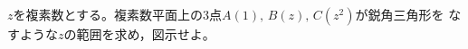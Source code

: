 \documentclass[../../main.tex]{subfiles}
\begin{document}
$z$を複素数とする。複素数平面上の3点$A(1), \, B(z), \, C(z^2)$が鋭角三角形を
なすような$z$の範囲を求め，図示せよ。
\end{document}
